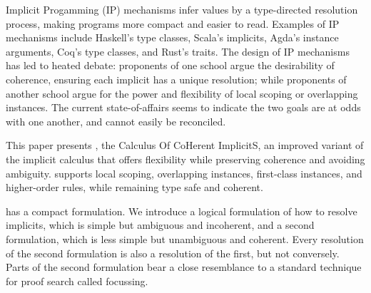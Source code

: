 Implicit Progamming (IP) mechanisms infer values by a type-directed
resolution process, making programs more compact and easier to read.
Examples of IP mechanisms include Haskell's type classes, Scala's
implicits, Agda's instance arguments, Coq's type classes, and Rust's
traits.  The design of IP mechanisms has led to heated debate:
proponents of one school argue the desirability of coherence, ensuring
each implicit has a unique resolution; while proponents of another
school argue for the power and flexibility of local scoping or
overlapping instances.  The current state-of-affairs seems to indicate
the two goals are at odds with one another, and cannot easily be
reconciled.

This paper presents \name, the Calculus Of CoHerent ImplicitS,
an improved variant of the implicit calculus that offers flexibility
while preserving coherence and avoiding ambiguity.  \name supports local scoping,
overlapping instances, first-class instances, and higher-order
rules, while remaining type safe and coherent.

\name has a compact formulation.
We introduce a logical formulation of how to resolve implicits, which
is simple but ambiguous and incoherent, and a second formulation,
which is less simple but unambiguous and coherent.  Every resolution
of the second formulation is also a resolution of the first, but not
conversely.  Parts of the second formulation bear a close resemblance
to a standard technique for proof search called focussing.






